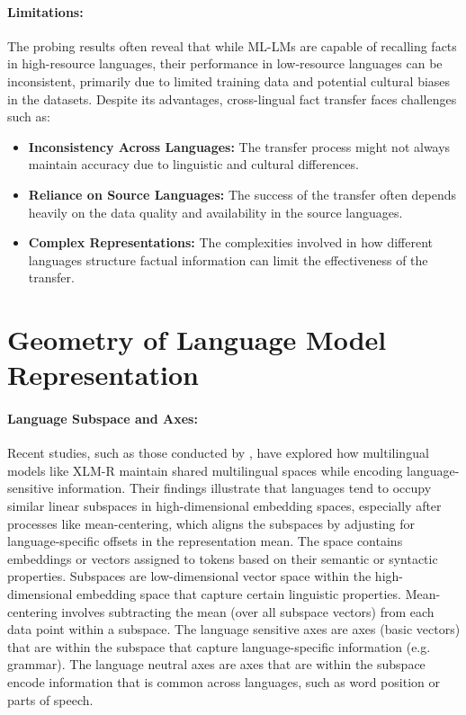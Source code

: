 \paragraph{Limitations:} The probing results often reveal that while ML-LMs are capable of recalling facts in high-resource languages, their performance in low-resource languages can be inconsistent, primarily due to limited training data and potential cultural biases in the datasets. Despite its advantages, cross-lingual fact transfer faces challenges such as:
\begin{itemize}
	\item \textbf{Inconsistency Across Languages:} The transfer process might not always maintain accuracy due to linguistic and cultural differences.
	\item \textbf{Reliance on Source Languages:} The success of the transfer often depends heavily on the data quality and availability in the source languages.
	\item \textbf{Complex Representations:} The complexities involved in how different languages structure factual information can limit the effectiveness of the transfer.
\end{itemize}

\section{Geometry of Language Model Representation}
\paragraph{Language Subspace and Axes:} Recent studies, such as those conducted by \citet{chang2022geometry}, have explored how multilingual models like XLM-R maintain shared multilingual spaces while encoding language-sensitive information. Their findings illustrate that languages tend to occupy similar linear subspaces in high-dimensional embedding spaces, especially after processes like mean-centering, which aligns the subspaces by adjusting for language-specific offsets in the representation mean. The space contains embeddings or vectors assigned to tokens based on their semantic or syntactic properties. Subspaces are low-dimensional vector space within the high-dimensional embedding space that capture certain linguistic properties. Mean-centering involves subtracting the mean (over all subspace vectors) from each data point within a subspace. The language sensitive axes are axes (basic vectors) that are within the subspace that capture language-specific information (e.g. grammar). The language neutral axes are axes that are within the subspace encode information that is common across languages, such as word position or parts of speech.

